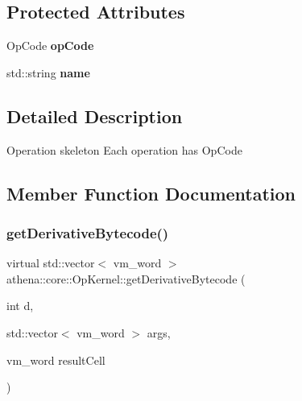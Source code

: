 \subsection*{Protected Attributes}
\begin{DoxyCompactItemize}
\item 
\mbox{\label{classathena_1_1core_1_1_op_kernel_ae77be87c4209176d927a6d83bcbf3592}} 
Op\+Code {\bfseries op\+Code}
\item 
\mbox{\label{classathena_1_1core_1_1_op_kernel_a5970ac8cb25cd956112a471d647789be}} 
std\+::string {\bfseries name}
\end{DoxyCompactItemize}


\subsection{Detailed Description}
Operation skeleton Each operation has Op\+Code 

\subsection{Member Function Documentation}
\mbox{\label{classathena_1_1core_1_1_op_kernel_ad500db1afc5a7c10acff8ecb8f1bee4d}} 
\subsubsection{\texorpdfstring{get\+Derivative\+Bytecode()}{getDerivativeBytecode()}}
{\footnotesize\ttfamily virtual std\+::vector$<$ vm\+\_\+word $>$ athena\+::core\+::\+Op\+Kernel\+::get\+Derivative\+Bytecode (\begin{DoxyParamCaption}\item[{int}]{d,  }\item[{std\+::vector$<$ vm\+\_\+word $>$}]{args,  }\item[{vm\+\_\+word}]{result\+Cell }\end{DoxyParamCaption})\hspace{0.3cm}{\ttfamily [pure virtual]}}

